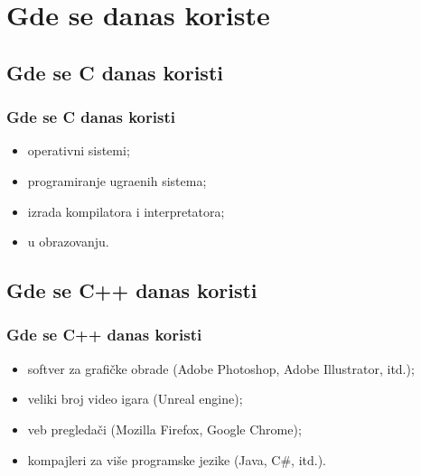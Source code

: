 \documentclass{beamer}
\def\d{{\fontencoding{T1}\selectfont\dj}}
\begin{document}
\section{Gde se danas koriste}

\subsection{Gde se C danas koristi}

\begin{frame}[fragile]\frametitle{Gde se C danas koristi}
    \begin{itemize}
        \item operativni sistemi;
        \item programiranje ugra\d enih sistema;
        \item izrada kompilatora i interpretatora;
        \item u obrazovanju.
    \end{itemize}
\end{frame}

\subsection{Gde se C++ danas koristi}

\begin{frame}[fragile]\frametitle{Gde se C++ danas koristi}
    \begin{itemize}
        \item softver za grafičke obrade (Adobe Photoshop, Adobe Illustrator, itd.);
        \item veliki broj video igara (Unreal engine);
        \item veb pregledači (Mozilla Firefox, Google Chrome);
        \item kompajleri za više programske jezike (Java, C\#, itd.).
    \end{itemize}
\end{frame}
\end{document}
